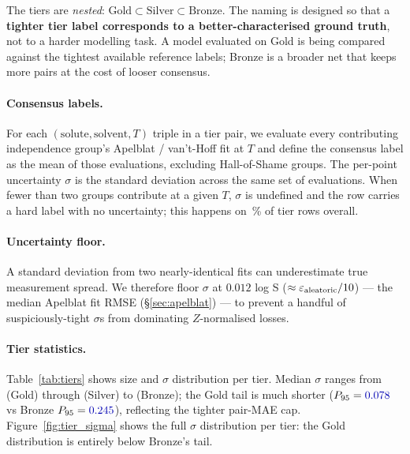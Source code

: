 The tiers are \emph{nested}: $\text{Gold} \subset \text{Silver} \subset
\text{Bronze}$.  The naming is designed so that a \textbf{tighter tier
label corresponds to a better-characterised ground truth}, not to a
harder modelling task.  A model evaluated on Gold is being compared
against the tightest available reference labels; Bronze is a broader
net that keeps more pairs at the cost of looser consensus.

\paragraph{Consensus labels.}
For each $(\mathrm{solute}, \mathrm{solvent}, T)$ triple in a tier pair,
we evaluate every contributing independence group's Apelblat /
van't-Hoff fit at $T$ and define the consensus label as the mean of
those evaluations, excluding Hall-of-Shame groups.  The per-point
uncertainty $\sigma$ is the standard deviation across the same set of
evaluations.  When fewer than two groups contribute at a given $T$,
$\sigma$ is undefined and the row carries a hard label with no
uncertainty; this happens on \,\% of tier rows overall.

\paragraph{Uncertainty floor.}
A standard deviation from two nearly-identical fits can underestimate
true measurement spread.  We therefore floor $\sigma$ at $0.012$ log S
($\approx \varepsilon_{\text{aleatoric}} / 10$) --- the median Apelblat fit RMSE
(§\ref{sec:apelblat}) --- to prevent a handful of suspiciously-tight
$\sigma$s from dominating $Z$-normalised losses.

\paragraph{Tier statistics.}
Table~\ref{tab:tiers} shows size and $\sigma$ distribution per tier.
Median $\sigma$ ranges from  (Gold) through 
(Silver) to  (Bronze); the Gold tail is much shorter
($P_{95} = \numval{0.078}$ vs Bronze $P_{95} = \numval{0.245}$),
reflecting the tighter pair-MAE cap.  Figure~\ref{fig:tier_sigma} shows
the full $\sigma$ distribution per tier: the Gold distribution is
entirely below Bronze's tail.

